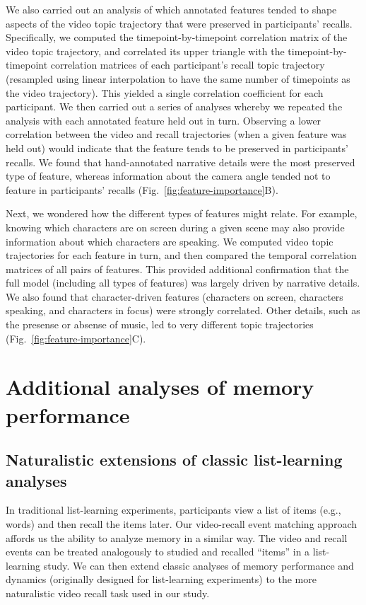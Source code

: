 \documentclass{article}
\begin{document}
We also carried out an analysis of which annotated features tended to shape aspects of the video topic trajectory that were preserved in participants' recalls.  Specifically, we computed the timepoint-by-timepoint correlation matrix of the video topic trajectory, and correlated its upper triangle with the timepoint-by-timepoint correlation matrices of each participant's recall topic trajectory (resampled using linear interpolation to have the same number of timepoints as the video trajectory).  This yielded a single correlation coefficient for each participant.  We then carried out a series of analyses whereby we repeated the analysis with each annotated feature held out in turn.  Observing a lower correlation between the video and recall trajectories (when a given feature was held out) would indicate that the feature tends to be preserved in participants' recalls.  We found that hand-annotated narrative details were the most preserved type of feature, whereas information about the camera angle tended not to feature in participants' recalls (Fig.~\ref{fig:feature-importance}B).

Next, we wondered how the different types of features might relate.  For example, knowing which characters are on screen during a given scene may also provide information about which characters are speaking.  We computed video topic trajectories for each feature in turn, and then compared the temporal correlation matrices of all pairs of features.  This provided additional confirmation that the full model (including all types of features) was largely driven by narrative details.  We also found that character-driven features (characters on screen, characters speaking, and characters in focus) were strongly correlated.  Other details, such as the presense or absense of music, led to very different topic trajectories (Fig.~\ref{fig:feature-importance}C).


\section*{Additional analyses of memory performance}

\subsection*{Naturalistic extensions of classic list-learning analyses}
In traditional list-learning experiments, participants view a list of items (e.g., words) and then recall the items later.  Our video-recall event matching approach affords us the ability to analyze memory in a similar way. The video and recall events can be treated analogously to studied and recalled ``items'' in a list-learning study.  We can then extend classic analyses of memory performance and dynamics (originally designed for list-learning experiments) to the more naturalistic video recall task used in our study.
\end{document}
